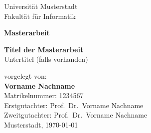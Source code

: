 \documentclass[12pt, a4paper, twocolumn, toc=listof, toc=bibliography]{scrreprt}
\begin{document}
\begin{titlepage}
    \centering
    \vspace*{2cm}

    {\Large Universität Musterstadt\\[0.3cm]}
    {\large Fakultät für Informatik\\[0.5cm]}

    \vspace{2cm}

    {\LARGE \textbf{Masterarbeit}\\[1cm]}

    {\Huge \textbf{Titel der Masterarbeit}\\[0.5cm]}
    {\Large Untertitel (falls vorhanden)\\[2cm]}

    \vspace{1cm}

    {\large
    vorgelegt von:\\[0.3cm]
    \textbf{Vorname Nachname}\\[0.3cm]
    Matrikelnummer: 1234567\\[1.5cm]

    Erstgutachter: Prof.\ Dr.\ Vorname Nachname\\
    Zweitgutachter: Prof.\ Dr.\ Vorname Nachname\\[1.5cm]

    Musterstadt, \today
    }

    \vfill
\end{titlepage}




\tableofcontents
\newpage

\listoffigures
\newpage

\listoftables
\newpage

\printglossary[type=\acronymtype, title=Abkürzungsverzeichnis]
\newpage









\end{document}
